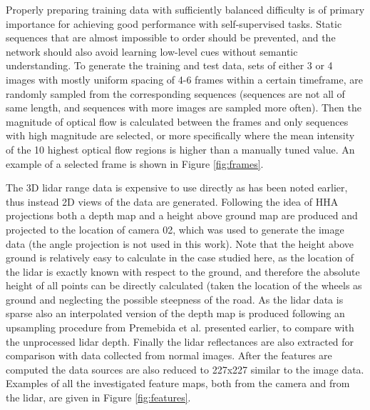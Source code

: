 Properly preparing training data with sufficiently balanced difficulty is of primary importance for achieving good performance with self-supervised tasks. Static sequences that are almost impossible to order should be prevented, and the network should also avoid learning low-level cues without semantic understanding. To generate the training and test data, sets of either 3 or 4 images with mostly uniform spacing of 4-6 frames within a certain timeframe, are randomly sampled from the corresponding sequences (sequences are not all of same length, and sequences with more images are sampled more often). Then the magnitude of optical flow is calculated between the frames and only sequences with high magnitude are selected\cite{misra2016}, or more specifically where the mean intensity of the 10 highest optical flow regions is higher than a manually tuned value. An example of a selected frame is shown in Figure \ref{fig:frames}.


The 3D lidar range data is expensive to use directly as has been noted earlier, thus instead 2D views of the data are generated. Following the idea of HHA projections both a depth map and a height above ground map are produced and projected to the location of camera 02, which was used to generate the image data (the angle projection is not used in this work). Note that the height above ground is relatively easy to calculate in the case studied here, as the location of the lidar is exactly known with respect to the ground, and therefore the absolute height of all points can be directly calculated (taken the location of the wheels as ground and neglecting the possible steepness of the road. As the lidar data is sparse also an interpolated version of the depth map is produced following an upsampling procedure from Premebida et al.\cite{premebida2014} presented earlier, to compare with the unprocessed lidar depth. Finally the lidar reflectances are also extracted for comparison with data collected from normal images. After the features are computed the data sources are also reduced to 227x227 similar to the image data. Examples of all the investigated feature maps, both from the camera and from the lidar, are given in Figure \ref{fig:features}.

